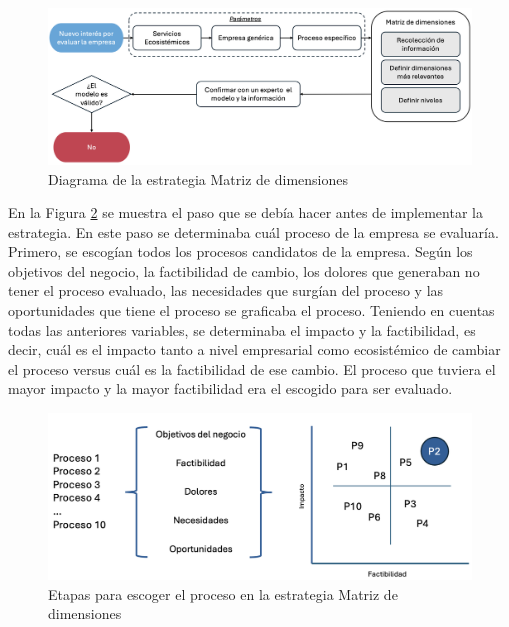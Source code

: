 \begin{figure}[h!]
    \centering
    \includegraphics[scale=0.35]{images/4-desarrollo/estrategia-matriz-dimensiones.png}
    \caption{Diagrama de la estrategia Matriz de dimensiones}
    \label{fig:estrategia-matriz-dimensiones}
\end{figure}

En la Figura \ref{fig:proceso-matriz-dimensiones} se muestra el paso que se debía hacer antes de implementar la estrategia. En este paso se determinaba cuál proceso de la empresa se evaluaría. Primero, se escogían todos los procesos candidatos de la empresa. Según los objetivos del negocio, la factibilidad de cambio, los dolores que generaban no tener el proceso evaluado, las necesidades que surgían del proceso y las oportunidades que tiene el proceso se graficaba el proceso. Teniendo en cuentas todas las anteriores variables, se determinaba el impacto y la factibilidad, es decir, cuál es el impacto tanto a nivel empresarial como ecosistémico de cambiar el proceso versus cuál es la factibilidad de ese cambio. El proceso que tuviera el mayor impacto y la mayor factibilidad era el escogido para ser evaluado.  

\begin{figure}[H]
    \centering
    \includegraphics[scale=0.45]{images/4-desarrollo/proceso-matriz-dimensiones.png}
    \caption{Etapas para escoger el proceso en la estrategia Matriz de dimensiones}
    \label{fig:proceso-matriz-dimensiones}
\end{figure}

